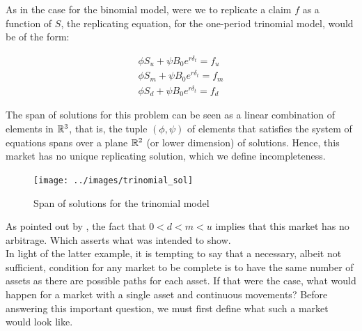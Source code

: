 \documentclass[../TGMAFFIRO.tex]{subfiles}
\begin{document}
As in the case for the binomial model, were we to replicate a claim $f$ as a function of $S$, the replicating equation, for the one-period trinomial model, would be of the form:

\begin{align*}
    \phi S_u + \psi B_0e^{r \delta_t} = f_u\\
    \phi S_m + \psi B_0e^{r \delta_t} = f_m\\
    \phi S_d + \psi B_0e^{r \delta_t} = f_d
\end{align*}

The span of solutions for this problem can be seen as a linear combination of elements in $\mathbb{R}^3$, that is, the tuple $(\phi, \psi)$ of elements that satisfies the system of equations spans over a plane $\mathbb{R}^2$ (or lower dimension) of solutions. Hence, this market has no unique replicating solution, which we define incompleteness.\\

\begin{figure}[hbt!]
  \texttt{[image: ../images/trinomial\_sol]}
  \caption{Span of solutions for the trinomial model}
\end{figure}

As pointed out by , the fact that $0 < d < m < u$ implies that this market has no arbitrage. Which asserts what was intended to show.\\

In light of the latter example, it is tempting to say that a necessary, albeit not sufficient, condition for any market to be complete is to have the same number of assets as there are possible paths for each asset. If that were the case, what would happen for a market with a single asset and continuous movements? Before answering this important question, we must first define what such a market would look like.\\
\end{document}
